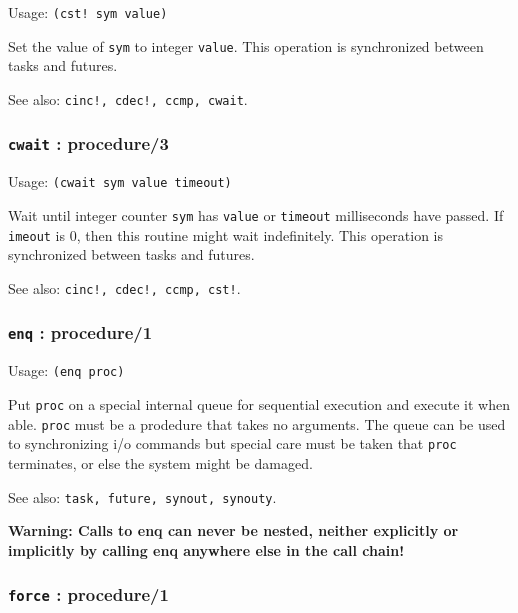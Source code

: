 \documentclass[
]{article}
\newcommand{\passthrough}[1]{#1}
\begin{document}
Usage: \passthrough{\lstinline"(cst! sym value)"}

Set the value of \passthrough{\lstinline!sym!} to integer
\passthrough{\lstinline!value!}. This operation is synchronized between
tasks and futures.

See also: \passthrough{\lstinline"cinc!, cdec!, ccmp, cwait"}.

\hypertarget{cwait-procedure3}{%
\subsubsection{\texorpdfstring{\texttt{cwait} :
procedure/3}{cwait : procedure/3}}\label{cwait-procedure3}}

Usage: \passthrough{\lstinline!(cwait sym value timeout)!}

Wait until integer counter \passthrough{\lstinline!sym!} has
\passthrough{\lstinline!value!} or \passthrough{\lstinline!timeout!}
milliseconds have passed. If \passthrough{\lstinline!imeout!} is 0, then
this routine might wait indefinitely. This operation is synchronized
between tasks and futures.

See also: \passthrough{\lstinline"cinc!, cdec!, ccmp, cst!"}.

\hypertarget{enq-procedure1}{%
\subsubsection{\texorpdfstring{\texttt{enq} :
procedure/1}{enq : procedure/1}}\label{enq-procedure1}}

Usage: \passthrough{\lstinline!(enq proc)!}

Put \passthrough{\lstinline!proc!} on a special internal queue for
sequential execution and execute it when able.
\passthrough{\lstinline!proc!} must be a prodedure that takes no
arguments. The queue can be used to synchronizing i/o commands but
special care must be taken that \passthrough{\lstinline!proc!}
terminates, or else the system might be damaged.

See also: \passthrough{\lstinline!task, future, synout, synouty!}.

\textbf{Warning: Calls to enq can never be nested, neither explicitly or
implicitly by calling enq anywhere else in the call chain!}

\hypertarget{force-procedure1}{%
\subsubsection{\texorpdfstring{\texttt{force} :
procedure/1}{force : procedure/1}}\label{force-procedure1}}
\end{document}
